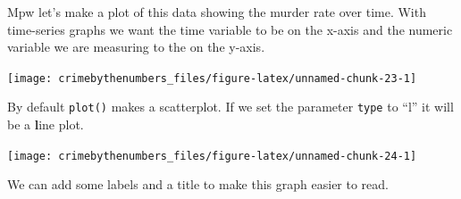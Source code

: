 \documentclass[
]{krantz}
\makeatletter
\newenvironment{Shaded}{\begin{snugshade}}{\end{snugshade}}
\newcommand{\AttributeTok}[1]{\textcolor[rgb]{0.61,0.61,0.61}{#1}}
\newcommand{\FunctionTok}[1]{\textcolor[rgb]{0,0,0}{#1}}
\newcommand{\NormalTok}[1]{#1}
\newcommand{\SpecialCharTok}[1]{\textcolor[rgb]{0,0,0}{#1}}
\newcommand{\StringTok}[1]{\textcolor[rgb]{0.5,0.5,0.5}{#1}}
\newenvironment{kframe}{%
\medskip{}
\setlength{\fboxsep}{.8em}
 \def\at@end@of@kframe{}%
 \ifinner\ifhmode%
  \def\at@end@of@kframe{\end{minipage}}%
  \begin{minipage}{\columnwidth}%
 \fi\fi%
 \def\FrameCommand##1{\hskip\@totalleftmargin \hskip-\fboxsep
 \colorbox{shadecolor}{##1}\hskip-\fboxsep
     \hskip-\linewidth \hskip-\@totalleftmargin \hskip\columnwidth}%
 \MakeFramed {\advance\hsize-\width
   \@totalleftmargin\z@ \linewidth\hsize
   \@setminipage}}%
 {\par\unskip\endMakeFramed%
 \at@end@of@kframe}
\renewenvironment{Shaded}{\begin{kframe}}{\end{kframe}}
\makeatother
\begin{document}
Mpw let's make a plot of this data showing the murder rate over time. With time-series graphs we want the time variable to be on the x-axis and the numeric variable we are measuring to the on the y-axis.

\begin{Shaded}
\end{Shaded}

\begin{center}\texttt{[image: crimebythenumbers\_files/figure-latex/unnamed-chunk-23-1]} \end{center}

By default \texttt{plot()} makes a scatterplot. If we set the parameter \texttt{type} to ``l'' it will be a \textbf{l}ine plot.

\begin{Shaded}
\end{Shaded}

\begin{center}\texttt{[image: crimebythenumbers\_files/figure-latex/unnamed-chunk-24-1]} \end{center}

We can add some labels and a title to make this graph easier to read.

\begin{Shaded}
\end{Shaded}
\end{document}
